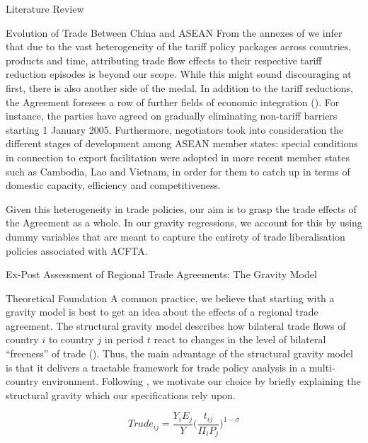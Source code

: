 \begin{section}{Literature Review}
\begin{subsection}{Evolution of Trade Between China and ASEAN}
From the annexes of \cite{asean_2002_4} we infer that due to the vast heterogeneity of the tariff policy packages across countries, products and time, attributing trade flow effects to their respective tariff reduction episodes is beyond our scope. While this might sound discouraging at first, there is also another side of the medal. In addition to the tariff reductions, the Agreement foresees a row of further fields of economic integration (\cite{asean_2002_1}). For instance, the parties have agreed on gradually eliminating non-tariff barriers starting 1 January 2005. Furthermore, negotiators took into consideration the different stages of development among ASEAN member states: special conditions in connection to export facilitation were adopted in more recent member states such as Cambodia, Lao and Vietnam, in order for them to catch up in terms of domestic capacity, efficiency and competitiveness.

Given this heterogeneity in trade policies, our aim is to grasp the trade effects of the Agreement as a whole. In our gravity regressions, we account for this by using dummy variables that are meant to capture the entirety of trade liberalisation policies associated with ACFTA.

\end{subsection}

\begin{subsection}{Ex-Post Assessment of Regional Trade Agreements: The Gravity Model}

\begin{subsubsection}{Theoretical Foundation}
A common practice, we believe that starting with a gravity model is best to get an idea about the effects of a regional trade agreement. The structural gravity model describes how bilateral trade flows of country $i$ to country $j$ in period $t$ react to changes in the level of bilateral “freeness” of trade (\cite{mvzj_2019}). Thus, the main advantage of the structural gravity model is that it delivers a tractable framework for trade policy analysis in a multi-country environment. Following \cite{ypl_2016}, we motivate our choice by briefly explaining the structural gravity which our specifications rely upon. 

\begin{equation}\label{eq_1}
    Trade_{ij}=\frac{Y_{i}E_{j}}{Y}\Big(\frac{t_{ij}}{\Pi_{i}P_{j}}\Big)^{1-\sigma}
\end{equation}


\end{subsubsection}
\end{subsection}
\end{section}
